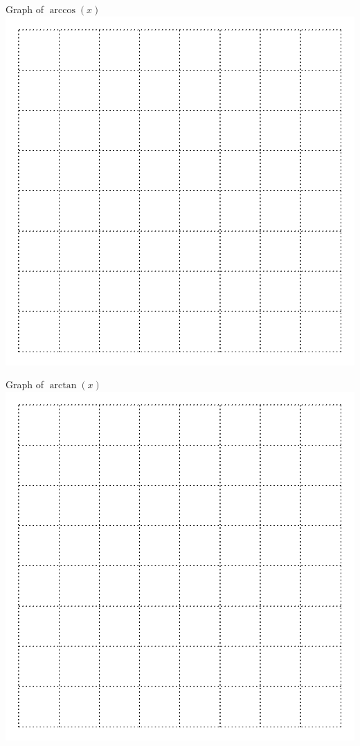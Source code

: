 \begin{minipage}[t]{0.45\linewidth}
\begin{center}
Graph of $\arccos(x)$ \\
\includegraphics[width=0.9\linewidth]{graphics/empty_graph_square_8}
\end{center}
\end{minipage}
\hfill
\begin{minipage}[t]{0.45\linewidth}
\begin{center}
Graph of $\arctan(x)$ \\
\includegraphics[width=0.9\linewidth]{graphics/empty_graph_square_8}
\end{center}
\end{minipage}
 \newpage

